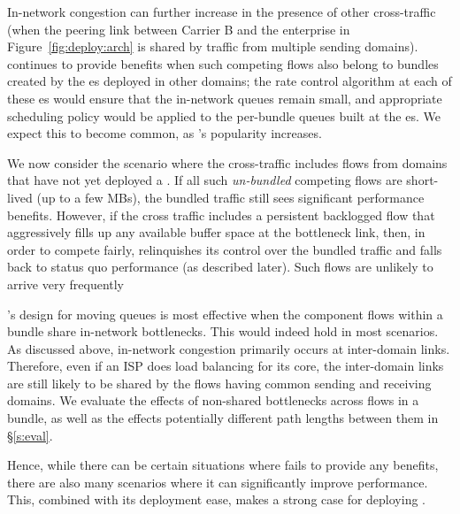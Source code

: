  In-network congestion can further increase in the presence of other cross-traffic (\eg when the peering link between Carrier B and the enterprise in Figure~\ref{fig:deploy:arch} is shared by traffic from multiple sending domains). \name continues to provide benefits when such competing flows also belong to bundles created by the {\inbox}es deployed in other domains; the rate control algorithm at each of these {\inbox}es would ensure that the in-network queues remain small, and appropriate scheduling policy would be applied to the per-bundle queues built at the {\inbox}es.
We expect this to become common, as \name's popularity increases. 

 We now consider the scenario where the cross-traffic includes flows from domains that have not yet deployed a \name. If all such \emph{un-bundled} competing flows are short-lived (up to a few MBs), the bundled traffic still sees significant performance benefits. However, if the cross traffic includes a persistent backlogged flow that aggressively fills up any available buffer space at the bottleneck link, then, in order to compete fairly, \name relinquishes its control over the bundled traffic and falls back to status quo performance (as described later). Such flows are unlikely to arrive very frequently


 \name's design for moving queues is most effective when the component flows within a bundle share in-network bottlenecks. 
This would indeed hold in most scenarios. 
As discussed above, in-network congestion primarily occurs at inter-domain links. Therefore, even if an ISP does load balancing for its core, the inter-domain links are still likely to be shared by the flows having common sending and receiving domains. We evaluate the effects of non-shared bottlenecks across flows in a bundle, as well as the effects potentially different path lengths between them in \S\ref{s:eval}. 

\vspace{0.05in}
\noindent Hence, while there can be certain situations where \name fails to provide any benefits, there are also many scenarios where it can significantly improve performance. This, combined with its deployment ease, makes a strong case for deploying \name. 



